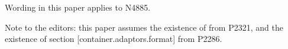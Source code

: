 
% 

Wording in this paper applies to N4885.

Note to the editors: this paper assumes the existence
of  from P2321, and the existence of section
[container.adaptors.format] from P2286.

\markboth{\contentsname}{}

\makeatletter
\renewcommand\@pnumwidth{2.5em}
\makeatother

\tableofcontents
\setcounter{tocdepth}{5}

%
